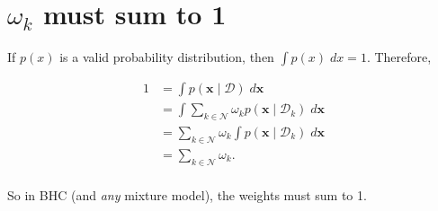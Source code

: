 \documentclass[letterpaper]{article}
\begin{document}
\section{$\omega_k$ must sum to 1}
\label{sec:omegak}

If $p(x)$ is a valid probability distribution, then $\int p(x) \; dx = 1$. Therefore,

\begin{align*}
1 &= \int p(\mathbf{x} \mid \mathcal{D}) \; d\mathbf{x} \\
  &= \int \sum_{k \in \mathcal{N}} \omega_k p(\mathbf{x} \mid \mathcal{D}_k) \; d\mathbf{x} \\
  &= \sum_{k \in \mathcal{N}} \omega_k \int p(\mathbf{x} \mid \mathcal{D}_k) \; d\mathbf{x} \\
  &= \sum_{k \in \mathcal{N}} \omega_k. \\
\end{align*}

So in BHC (and \emph{any} mixture model), the weights must sum to 1.

\end{document}
